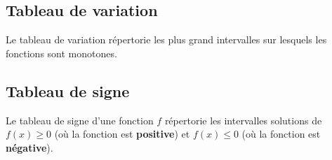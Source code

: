 \documentclass{article}
\begin{document}
\subsection{Tableau de variation}
\begin{definition}
Le tableau de variation répertorie les plus grand intervalles sur lesquels les fonctions sont monotones. 
\end{definition}
\begin{example}
\hfill

\vspace*{0.2cm}
\begin{minipage}{0.45\textwidth}
\end{minipage}
\hfill\vline\hfill
\begin{minipage}{0.45\textwidth}
\end{minipage}
\end{example}
\subsection{Tableau de signe}
\begin{definition}
Le tableau de signe d'une fonction $f$ répertorie les intervalles solutions de $f(x) \geq 0$ (où la fonction est \textbf{positive}) et $f(x) \leq 0$ (où la fonction est \textbf{négative}).
\end{definition}
\begin{example}
\hfill

\vspace*{0.2cm}
\begin{minipage}{0.45\textwidth}
\end{minipage}
\hfill\vline\hfill
\begin{minipage}{0.45\textwidth}
\end{minipage}
\end{example}
\end{document}

